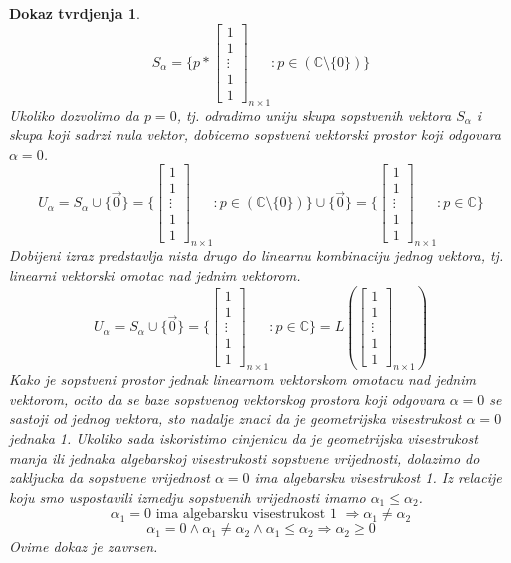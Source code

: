 \documentclass[11pt]{article}
\newtheorem*{custom_proof}{Dokaz tvrdjenja}
\begin{document}
\begin{custom_proof}
	\[
	S_{\alpha} = \{p *
	\begin{bmatrix} 
	1 \\ 1 \\ \vdots \\ 1 \\ 1
	\end{bmatrix}_{n \times 1} : p \in (\mathbb{C} \setminus \{0\}) \} 
	\]
	Ukoliko dozvolimo da $p=0$, tj. odradimo uniju skupa sopstvenih vektora $S_{\alpha}$ i skupa koji sadrzi nula vektor, dobicemo sopstveni vektorski prostor koji odgovara $\alpha = 0$.
	\[
	U_{\alpha} = S_{\alpha} \cup \{\vec{0}\}= \{
	\begin{bmatrix} 
	1 \\ 1 \\ \vdots \\ 1 \\ 1
	\end{bmatrix}_{n \times 1}  : p \in (\mathbb{C} \setminus \{0\}) \} \cup \{\vec{0}\}= \{
	\begin{bmatrix} 
	1 \\ 1 \\ \vdots \\ 1 \\ 1
	\end{bmatrix}_{n \times 1} :  p \in \mathbb{C}\} 
	\]
	Dobijeni izraz predstavlja nista drugo do linearnu kombinaciju jednog vektora, tj. linearni vektorski omotac nad jednim vektorom.
	\[
	U_{\alpha} = S_{\alpha} \cup \{\vec{0}\}= \{
	\begin{bmatrix} 
	1 \\ 1 \\ \vdots \\ 1 \\ 1
	\end{bmatrix}_{n \times 1} :  p \in \mathbb{C}\} = L (\begin{bmatrix} 
	1 \\ 1 \\ \vdots \\ 1 \\ 1
	\end{bmatrix}_{n \times 1})
	\]
	Kako je sopstveni prostor jednak linearnom vektorskom omotacu nad jednim vektorom, ocito da se baze sopstvenog vektorskog prostora koji odgovara $\alpha = 0$ se sastoji od jednog vektora, sto nadalje znaci da je geometrijska visestrukost $\alpha = 0$ jednaka 1.
	Ukoliko sada iskoristimo cinjenicu da je geometrijska visestrukost manja ili jednaka algebarskoj visestrukosti sopstvene vrijednosti, dolazimo do zakljucka da sopstvene vrijednost $\alpha = 0 $ ima algebarsku visestrukost 1. Iz relacije koju smo uspostavili izmedju sopstvenih vrijednosti imamo $\alpha_1 \leq \alpha_2$.
	\[
	\alpha_1 = 0 \text{ ima algebarsku visestrukost 1 } \Rightarrow \alpha_1 \neq \alpha_2
	\]
	\[
	\alpha_1 = 0  \land \alpha_1 \neq \alpha_2 \land \alpha_1 \leq \alpha_2 \Rightarrow \alpha_2 \ge 0
	\]
	Ovime dokaz je zavrsen.
	\end{custom_proof}
	
\end{document}
